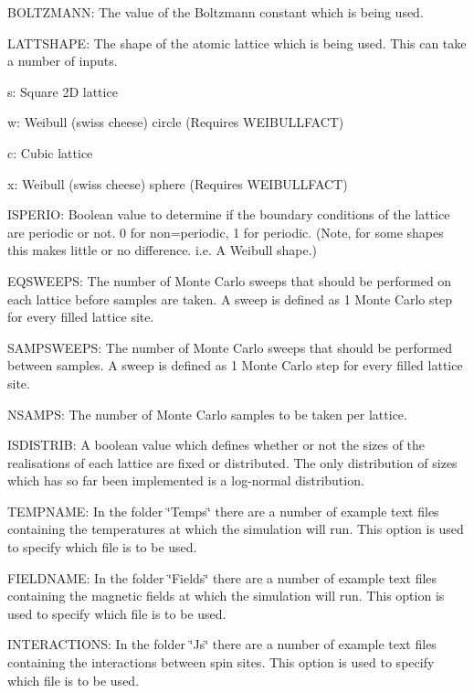 \begin{DoxyItemize}
\item B\+O\+L\+T\+Z\+M\+A\+NN\+: The value of the Boltzmann constant which is being used.
\item L\+A\+T\+T\+S\+H\+A\+PE\+: The shape of the atomic lattice which is being used. This can take a number of inputs.
\begin{DoxyItemize}
\item s\+: Square 2D lattice
\item w\+: Weibull (swiss cheese) circle (Requires W\+E\+I\+B\+U\+L\+L\+F\+A\+CT)
\item c\+: Cubic lattice
\item x\+: Weibull (swiss cheese) sphere (Requires W\+E\+I\+B\+U\+L\+L\+F\+A\+CT)
\end{DoxyItemize}
\item I\+S\+P\+E\+R\+IO\+: Boolean value to determine if the boundary conditions of the lattice are periodic or not. 0 for non=periodic, 1 for periodic. (Note, for some shapes this makes little or no difference. i.\+e. A Weibull shape.)
\item E\+Q\+S\+W\+E\+E\+PS\+: The number of Monte Carlo sweeps that should be performed on each lattice before samples are taken. A sweep is defined as 1 Monte Carlo step for every filled lattice site.
\item S\+A\+M\+P\+S\+W\+E\+E\+PS\+: The number of Monte Carlo sweeps that should be performed between samples. A sweep is defined as 1 Monte Carlo step for every filled lattice site.
\item N\+S\+A\+M\+PS\+: The number of Monte Carlo samples to be taken per lattice.
\item I\+S\+D\+I\+S\+T\+R\+IB\+: A boolean value which defines whether or not the sizes of the realisations of each lattice are fixed or distributed. The only distribution of sizes which has so far been implemented is a log-\/normal distribution.
\item T\+E\+M\+P\+N\+A\+ME\+: In the folder \char`\"{}\+Temps\char`\"{} there are a number of example text files containing the temperatures at which the simulation will run. This option is used to specify which file is to be used.
\item F\+I\+E\+L\+D\+N\+A\+ME\+: In the folder \char`\"{}\+Fields\char`\"{} there are a number of example text files containing the magnetic fields at which the simulation will run. This option is used to specify which file is to be used.
\item I\+N\+T\+E\+R\+A\+C\+T\+I\+O\+NS\+: In the folder \char`\"{}\+Js\char`\"{} there are a number of example text files containing the interactions between spin sites. This option is used to specify which file is to be used.

\end{DoxyItemize}
